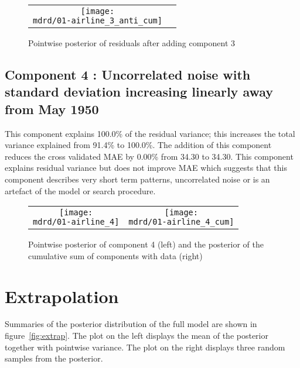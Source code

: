 \documentclass{article} %
\begin{document}
\begin{figure}[H]
\newcommand{\wmgd}{0.5\columnwidth}
\newcommand{\hmgd}{3.0cm}
\newcommand{\mdrd}{01-airline}
\newcommand{\mbm}{\hspace{-0.3cm}}
\begin{tabular}{cc}
\mbm \texttt{[image: \\mdrd/01-airline\_3\_anti\_cum]}
\end{tabular}
\caption{Pointwise posterior of residuals after adding component 3}
\label{fig:comp3}
\end{figure}

\subsection{Component 4 : Uncorrelated noise with standard deviation increasing linearly away from May 1950}



This component explains 100.0\% of the residual variance; this increases the total variance explained from 91.4\% to 100.0\%.
The addition of this component reduces the cross validated MAE by 0.00\% from 34.30 to 34.30.
This component explains residual variance but does not improve MAE which suggests that this component describes very short term patterns, uncorrelated noise or is an artefact of the model or search procedure.

\begin{figure}[H]
\newcommand{\wmgd}{0.5\columnwidth}
\newcommand{\hmgd}{3.0cm}
\newcommand{\mdrd}{01-airline}
\newcommand{\mbm}{\hspace{-0.3cm}}
\begin{tabular}{cc}
\mbm \texttt{[image: \\mdrd/01-airline\_4]} & \texttt{[image: \\mdrd/01-airline\_4\_cum]}
\end{tabular}
\caption{Pointwise posterior of component 4 (left) and the posterior of the cumulative sum of components with data (right)}
\label{fig:comp4}
\end{figure}

\section{Extrapolation}
\label{sec:extrap}

Summaries of the posterior distribution of the full model are shown in figure~\ref{fig:extrap}.
The plot on the left displays the mean of the posterior together with pointwise variance.
The plot on the right displays three random samples from the posterior.
\end{document}
